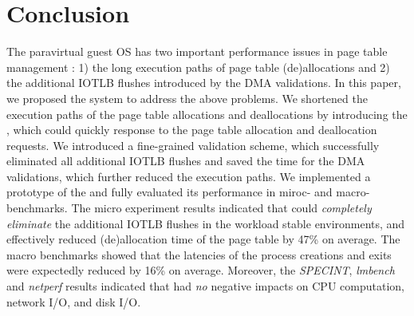 \section{Conclusion} \label{sec:con}
The paravirtual guest OS has two important performance issues in page table management : 1) the long execution paths of page table (de)allocations and 2) the additional IOTLB flushes introduced by the DMA validations.
In this paper, we proposed the \name system to address the above problems.
We shortened the execution paths of the page table allocations and deallocations by introducing the \cache, which could quickly response to the page table allocation and deallocation requests.
We introduced a fine-grained validation scheme, which successfully eliminated all additional IOTLB flushes and saved the time for the DMA validations, which further reduced the execution paths.
We implemented a prototype of the \name and fully evaluated its performance in miroc- and macro-benchmarks.
The micro experiment results indicated that \name could \emph{completely eliminate} the additional IOTLB flushes in the workload stable environments, and effectively reduced (de)allocation time of the page table by 47\% on average.
The macro benchmarks showed that the latencies of the process creations and exits were expectedly reduced by 16\% on average.
Moreover, the \emph{SPECINT}, \emph{lmbench} and \emph{netperf} results indicated that \name had \emph{no} negative impacts on CPU computation, network I/O, and disk I/O.
